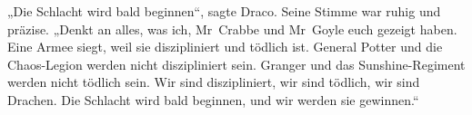 „Die Schlacht wird bald beginnen“, sagte Draco. Seine Stimme war ruhig und präzise.
„Denkt an alles, was ich, Mr~Crabbe und Mr~Goyle euch gezeigt haben. Eine Armee siegt, weil sie diszipliniert und tödlich ist. General Potter und die Chaos-Legion werden nicht diszipliniert sein. Granger und das Sunshine-Regiment werden nicht tödlich sein. Wir sind diszipliniert, wir sind tödlich, wir sind Drachen. Die Schlacht wird bald beginnen, und wir werden sie gewinnen.“


